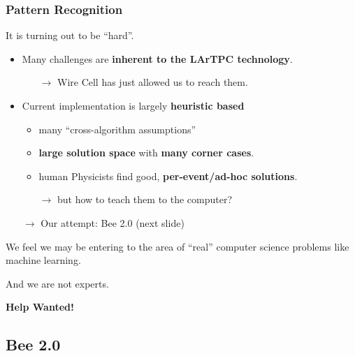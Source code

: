 \documentclass[xcolor=dvipsnames]{beamer}
\begin{document}
\begin{frame}
  \frametitle{Pattern Recognition}
  It is turning out to be ``hard''.
  \footnotesize
  \begin{itemize}
  \item Many challenges are \textbf{inherent to the LArTPC technology}.  
    \begin{itemize}\scriptsize
    \item[$\rightarrow$] Wire Cell has just allowed us to reach them.
    \end{itemize}
  \item Current implementation is largely \textbf{heuristic based}
    \begin{itemize}\scriptsize
    \item many ``cross-algorithm assumptions''
    \item \textbf{large solution space} with \textbf{many corner cases}.
    \item human Physicists find good, \textbf{per-event/ad-hoc solutions}.
    \item[$\rightarrow$] but how to teach them to the computer?
    \end{itemize}
  \item[$\rightarrow$] Our attempt: Bee 2.0 (next slide) 
  \end{itemize}
  
  We feel we may be entering to the area of ``real'' computer science
  problems like machine learning.

  \vspace{2mm}

  And we are not experts. 

  \vspace{2mm}

  \textbf{Help Wanted!}

\end{frame}

\subsection{Bee 2.0}
\end{document}
